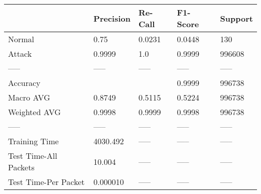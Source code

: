 \begin{tabular}{lllll}
\toprule
{} & Precision & Re-Call & F1-Score & Support \\
\midrule
Normal                &      0.75 &  0.0231 &   0.0448 &     130 \\
Attack                &    0.9999 &     1.0 &   0.9999 &  996608 \\
-----                 &     ----- &   ----- &    ----- &   ----- \\
Accuracy              &           &         &   0.9999 &  996738 \\
Macro AVG             &    0.8749 &  0.5115 &   0.5224 &  996738 \\
Weighted AVG          &    0.9998 &  0.9999 &   0.9998 &  996738 \\
-----                 &     ----- &   ----- &    ----- &   ----- \\
Training Time         &  4030.492 &   ----- &    ----- &   ----- \\
Test Time-All Packets &    10.004 &   ----- &    ----- &   ----- \\
Test Time-Per Packet  &  0.000010 &   ----- &    ----- &   ----- \\
\bottomrule
\end{tabular}
